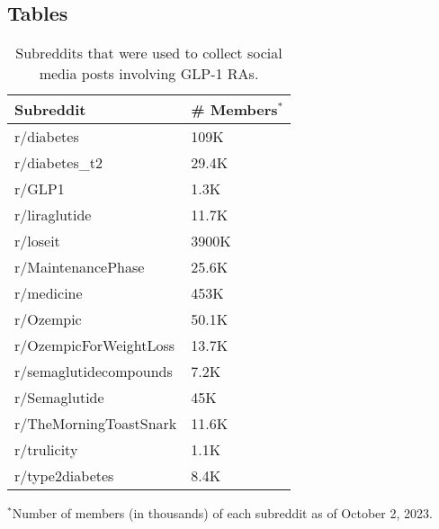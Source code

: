 \documentclass[referee,bst/sn-basic]{sn-jnl}%
\begin{document}
\subsection*{Tables}
\begin{table}[h]
\caption{Subreddits that were used to collect social media posts involving GLP-1 RAs.}
\label{tbl:reddit}
\centering
\begin{tabular}{ll}
\toprule
Subreddit               & \# Members$^*$ \\
\midrule
r/diabetes            & 109K \\
r/diabetes\_t2            & 29.4K \\
r/GLP1       & 1.3K \\
r/liraglutide            & 11.7K \\
r/loseit         & 3900K \\
r/MaintenancePhase             & 25.6K \\
r/medicine           & 453K \\
r/Ozempic                  & 50.1K \\
r/OzempicForWeightLoss     & 13.7K \\
r/semaglutidecompounds           & 7.2K \\
r/Semaglutide              & 45K \\
r/TheMorningToastSnark              & 11.6K \\
r/trulicity              & 1.1K \\
r/type2diabetes           & 8.4K \\
\bottomrule
\end{tabular}
$^*$Number of members (in thousands) of each subreddit as of October 2, 2023.
\end{table}
\end{document}
